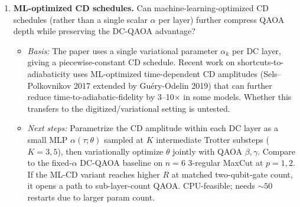\begin{enumerate}
  \item \textbf{ML-optimized CD schedules.} Can machine-learning-optimized CD schedules (rather than a single scalar $\alpha$ per layer) further compress QAOA depth while preserving the DC-QAOA advantage?
  \begin{itemize}
    \item \emph{Basis:} The paper uses a single variational parameter $\alpha_k$ per DC layer, giving a piecewise-constant CD schedule. Recent work on shortcuts-to-adiabaticity uses ML-optimized time-dependent CD amplitudes (Sels--Polkovnikov 2017 extended by Gu\'ery-Odelin 2019) that can further reduce time-to-adiabatic-fidelity by 3--10$\times$ in some models. Whether this transfers to the digitized/variational setting is untested.
    \item \emph{Next steps:} Parametrize the CD amplitude within each DC layer as a small MLP $\alpha(\tau;\theta)$ sampled at $K$ intermediate Trotter substeps ($K=3, 5$), then variationally optimize $\theta$ jointly with QAOA $\beta,\gamma$. Compare to the fixed-$\alpha$ DC-QAOA baseline on $n=6$ 3-regular MaxCut at $p=1,2$. If the ML-CD variant reaches higher $R$ at matched two-qubit-gate count, it opens a path to sub-layer-count QAOA. CPU-feasible; needs ${\sim}50$ restarts due to larger param count.
  \end{itemize}
\end{enumerate}
